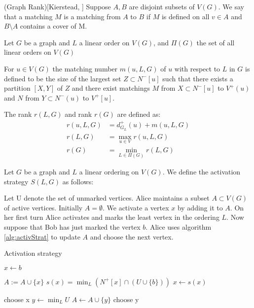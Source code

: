 \begin{definition}(Graph Rank)[Kierstead, \cite{KIERSTEAD2000}] \label{defnRank}
    Suppose $A,B$ are disjoint subsets of $V(G)$. We say that a matching $M$ is a matching from $A$ to $B$ if $M$ is defined on all $v\in A$ and $B\setminus A$ contains a cover of M. 
    
    Let $G$ be a graph and $L$ a linear order on $V(G)$, and $\Pi(G)$ the set of all linear orders on $V(G)$
        
    For $u \in V(G)$ the matching number $m(u, L, G)$ of $u$ with respect to $L$ in $G$ is defined to be the size of the largest set $Z \subset N^-[u]$ such that there exists a partition $[X, Y]$ of $Z$ and there exist matchings $M$ from
    $X\subset N^-[u]$ to $V^+(u)$ and $N$ from $Y\subset N^-(u)$ to $V^+[u]$.
    
    The rank $r(L,G)$ and rank $r(G)$ are defined as:
    \begin{align*}
    	r(u,L,G) & = d^+_{G_L}(u) + m(u,L,G) \\
    	r(L,G)   & = \max_{u \in V}r(u,L,G)  \\
    	r(G)     & = \min_{L \in \Pi(G)} r(L,G)
    \end{align*}
\end{definition}

\begin{definition} 
    Let $G$ be a graph and $L$ a linear ordering on $V(G)$. We define the activation strategy $S(L,G)$ as follows:
    
    Let U denote the set of unmarked vertices. Alice maintains a subset $A \subset V(G)$ of active vertices. Initially $A = \emptyset$. We activate a vertex $x$ by adding it to $A$. On her first turn Alice activates and marks the least vertex in the ordering $L$. Now suppose that Bob has just marked the vertex $b$. Alice uses algorithm \ref{alg:activStrat} to update $A$ and choose the next vertex.
    \begin{algorithm}[h]
        \caption{Activation strategy}
        \label{alg:activStrat}
        \begin{algorithmic}[1]
            \Statex
            \State $x \gets b$ 
            
                \State $A := A \cup \{x\}$
                \State $s(x) =\min_L(N^+[x] \cap (U \cup \{b\} ))$
                \State $x \gets s(x)$
            \EndWhile      
            
                \State choose x
            \Else
                \State $y \gets \min_L U$
                    \State $A \gets A \cup \{y\}$                    
                \EndIf     
                \State choose y
            \EndIf   
        \end{algorithmic}
    \end{algorithm}
    
\end{definition}

